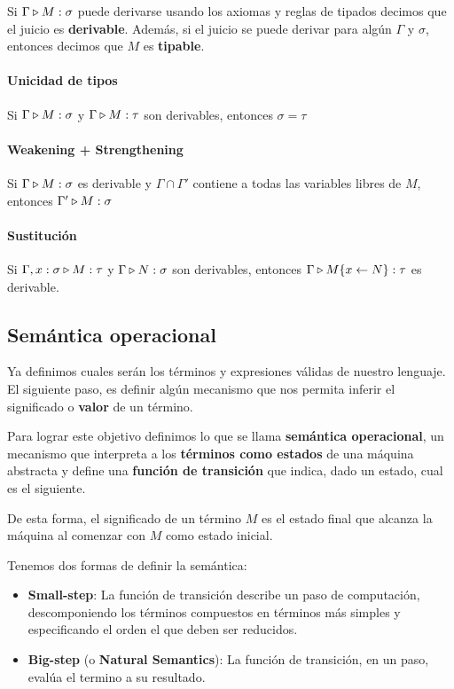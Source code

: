 Si $\Gamma\triangleright M : \sigma$ puede derivarse usando los axiomas y reglas de tipados decimos que el juicio es \textbf{derivable}. Además, si el juicio se puede derivar para algún $\Gamma$ y $\sigma$, entonces decimos que $M$ es \textbf{tipable}.

\paragraph{Unicidad de tipos} Si $\Gamma\triangleright M : \sigma$ y $\Gamma\triangleright M : \tau$ son derivables, entonces $\sigma = \tau$

\paragraph{Weakening + Strengthening} Si $\Gamma\triangleright M : \sigma$ es derivable y $\Gamma\cap\Gamma'$ contiene a todas las variables libres de $M$, entonces $\Gamma'\triangleright M : \sigma$

\paragraph{Sustitución} Si $\Gamma,x:\sigma\triangleright M : \tau$ y $\Gamma\triangleright N : \sigma$ son derivables, entonces $\Gamma\triangleright M\{x\leftarrow N\} : \tau$ es derivable.

\subsection{Semántica operacional}
Ya definimos cuales serán los términos y expresiones válidas de nuestro lenguaje. El siguiente paso, es definir algún mecanismo que nos permita inferir el significado o \textbf{valor} de un término. 

Para lograr este objetivo definimos lo que se llama \textbf{semántica operacional}, un mecanismo que interpreta a los \textbf{términos como estados} de una máquina abstracta y define una \textbf{función de transición} que indica, dado un estado, cual es el siguiente.

De esta forma, el significado de un término $M$ es el estado final que alcanza la máquina al comenzar con $M$ como estado inicial.

Tenemos dos formas de definir la semántica:
\begin{itemize}
    \item \textbf{Small-step}: La función de transición describe un paso de computación, descomponiendo los términos compuestos en términos más simples y especificando el orden el que deben ser reducidos.
    \item \textbf{Big-step} (o \textbf{Natural Semantics}): La función de transición, en un paso, evalúa el termino a su resultado.
\end{itemize}

